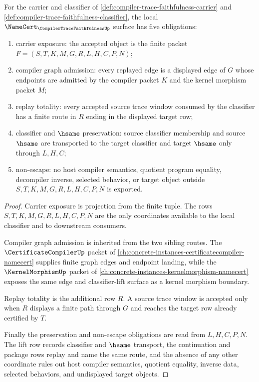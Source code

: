 \begin{theorem}
\label{thm:compiler-trace-faithfulness-namecert-obligations}
For the carrier and classifier of \autoref{def:compiler-trace-faithfulness-carrier} and \autoref{def:compiler-trace-faithfulness-classifier}, the local $\NameCert_{\CompilerTraceFaithfulnessUp}$ surface has five obligations:
\begin{enumerate}
\item carrier exposure: the accepted object is the finite packet $F=(S,T,K,M,G,R,L,H,C,P,N)$;
\item compiler graph admission: every replayed edge is a displayed edge of $G$ whose endpoints are admitted by the compiler packet $K$ and the kernel morphism packet $M$;
\item replay totality: every accepted source trace window consumed by the classifier has a finite route in $R$ ending in the displayed target row;
\item classifier and $\hsame$ preservation: source classifier membership and source $\hsame$ are transported to the target classifier and target $\hsame$ only through $L,H,C$;
\item non-escape: no host compiler semantics, quotient program equality, decompiler inverse, selected behavior, or target object outside $S,T,K,M,G,R,L,H,C,P,N$ is exported.
\end{enumerate}
\end{theorem}
\begin{proof}
Carrier exposure is projection from the finite tuple. The rows $S,T,K,M,G,R,L,H,C,P,N$ are the only coordinates available to the local classifier and to downstream consumers.

Compiler graph admission is inherited from the two sibling routes. The $\CertificateCompilerUp$ packet of \autoref{ch:concrete-instances-certificatecompiler-namecert} supplies finite graph edges and endpoint landing, while the $\KernelMorphismUp$ packet of \autoref{ch:concrete-instances-kernelmorphism-namecert} exposes the same edge and classifier-lift surface as a kernel morphism boundary.

Replay totality is the additional row $R$. A source trace window is accepted only when $R$ displays a finite path through $G$ and reaches the target row already certified by $T$.

Finally the preservation and non-escape obligations are read from $L,H,C,P,N$. The lift row records classifier and $\hsame$ transport, the continuation and package rows replay and name the same route, and the absence of any other coordinate rules out host compiler semantics, quotient equality, inverse data, selected behaviors, and undisplayed target objects.
\end{proof}

